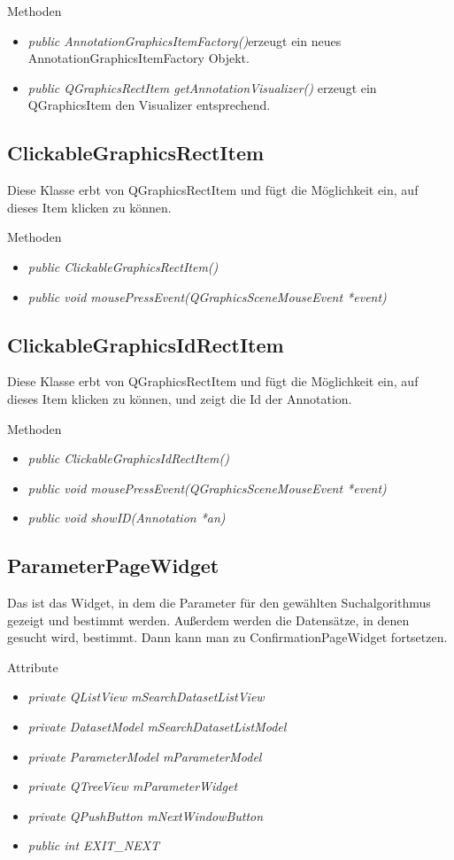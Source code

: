 Methoden
\begin{itemize}
	\item\textit{public AnnotationGraphicsItemFactory()}erzeugt ein neues AnnotationGraphicsItemFactory Objekt.
	\item\textit{public QGraphicsRectItem getAnnotationVisualizer()} erzeugt ein QGraphicsItem den Visualizer entsprechend.
\end{itemize}
 
\subsection*{ClickableGraphicsRectItem}
Diese Klasse erbt von QGraphicsRectItem und fügt die Möglichkeit ein, auf dieses Item klicken zu können.

Methoden
\begin{itemize}
	\item\textit{public ClickableGraphicsRectItem()}
	\item\textit{public void mousePressEvent(QGraphicsSceneMouseEvent *event)}
\end{itemize}

\subsection*{ClickableGraphicsIdRectItem}
Diese Klasse erbt von QGraphicsRectItem und fügt die Möglichkeit ein, auf dieses Item klicken zu können, und zeigt die Id der Annotation.

Methoden
\begin{itemize}
	\item\textit{public ClickableGraphicsIdRectItem()}
	\item\textit{public void mousePressEvent(QGraphicsSceneMouseEvent *event)}
	\item\textit{public void showID(Annotation *an)}
\end{itemize}

\subsection*{ParameterPageWidget}
Das ist das Widget, in dem die Parameter für den gewählten Suchalgorithmus gezeigt und bestimmt werden. Außerdem werden die Datensätze, in denen gesucht wird, bestimmt. Dann kann man zu ConfirmationPageWidget fortsetzen.

Attribute
\begin{itemize}
	\item\textit{private QListView mSearchDatasetListView}
	\item\textit{private DatasetModel mSearchDatasetListModel}
	\item\textit{private ParameterModel mParameterModel}
	\item\textit{private QTreeView mParameterWidget}
	\item\textit{private QPushButton mNextWindowButton}
	\item\textit{public int EXIT\_NEXT}     
\end{itemize}

